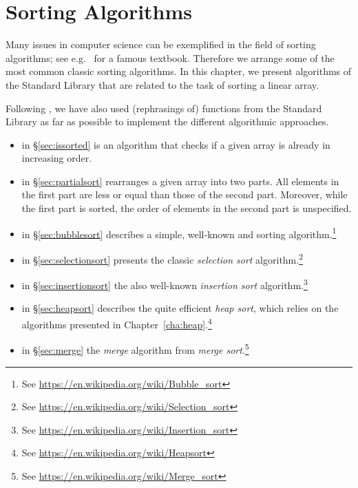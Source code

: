 
\chapter{Sorting Algorithms}



Many issues in computer science can be exemplified in the field of
sorting algorithms; see e.g.\ \cite{Knuth.1973} for a famous textbook.
Therefore we arrange some of the most common classic
sorting algorithms.
In this chapter, we present algorithms of the \cxx Standard
Library \cite[\S 28.7.1]{cxx-17-draft} that are related to the task
of sorting a linear array.

Following \cite{Sellibitze.2014}, we have also used (\isoc rephrasings of) 
functions from the \cxx Standard Library as far as possible to implement the different
algorithmic approaches.

\begin{itemize}
\item \issorted in \S\ref{sec:issorted} is an algorithm that checks if a given
array is already in increasing order.

\item \partialsort in \S\ref{sec:partialsort} rearranges a given
array into two parts. All elements in the first part are less or equal than
those of the second part. Moreover, while the first part is sorted,
the order of elements in the second part is unspecified.

\item \bubblesort in \S\ref{sec:bubblesort} describes a simple, well-known and 
      sorting algorithm.\footnote{
   See \url{https://en.wikipedia.org/wiki/Bubble_sort}
}

\item
\selectionsort in \S\ref{sec:selectionsort} presents the classic
\emph{selection sort} algorithm.\footnote{
   See \url{https://en.wikipedia.org/wiki/Selection_sort}
}

\item \insertionsort in \S\ref{sec:insertionsort} the also well-known
\emph{insertion sort} algorithm.\footnote{
   See \url{https://en.wikipedia.org/wiki/Insertion_sort}
}

\item \heapsort in \S\ref{sec:heapsort} describes the quite efficient \emph{heap sort},
which relies on the algorithms presented in Chapter~\ref{cha:heap}.\footnote{
   See \url{https://en.wikipedia.org/wiki/Heapsort}
}

\item \merge in \S\ref{sec:merge} the \emph{merge} algorithm from \emph{merge sort}.\footnote{
  See \url{https://en.wikipedia.org/wiki/Merge_sort}
}
\end{itemize}

